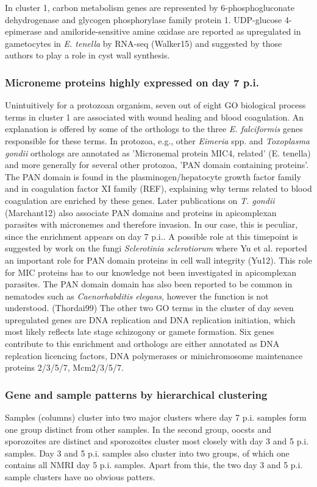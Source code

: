 \documentclass{bmcart}
\begin{document}
In cluster 1, carbon metabolism genes are represented by 6-phosphogluconate dehydrogenase 
and glycogen phosphorylase family protein 1. UDP-glucose 4-epimerase and amiloride-sensitive 
amine oxidase are reported as upregulated in gametocytes in \textit{E. tenella} by 
RNA-seq (Walker15) and suggested by those authors to play a role in cyst wall synthesis.

\subsubsection*{Microneme proteins highly expressed on day 7 p.i.}
Unintuitively for a protozoan organism, seven out of eight GO biological process terms
in cluster 1 are associated with wound healing and blood coagulation.
An explanation is offered by some of the orthologs to the three \textit{E. falciformis} genes
responsible for these terms. In protozoa, e.g., other \textit{Eimeria} spp. and 
\textit{Toxoplasma gondii} orthologs are annotated as 'Micronemal protein MIC4,
related' (E. tenella) and more generally for several other protozoa, 'PAN domain containing proteins'.
The PAN domain is found in the plasminogen/hepatocyte growth factor family and in coagulation 
factor XI family (REF), explaining why terms related to blood coagulation are enriched by these genes.
Later publications on \textit{T. gondii} (Marchant12) also associate PAN domains and proteins in 
apicomplexan parasites with micronemes and therefore invasion. In our case, this is peculiar, since 
the enrichment appears on day 7 p.i.. A possible role at this timepoint is suggested by work on 
the fungi \textit{Sclerotinia sclerotiorum} where Yu et al. reported an important role for PAN domain
proteins in cell wall integrity (Yu12). This role for MIC proteins has to our knowledge 
not been investigated in apicomplexan parasites. 
The PAN domain domain has also been reported to be common in nematodes such as 
\textit{Caenorhabditis elegans}, however the function is not understood. (Thordai99)
The other two GO terms in the cluster of day seven upregulated genes are DNA replication and DNA 
replication initiation, which most likely reflects late stage schizogony or gamete formation.
Six genes contribute to this enrichment and orthologs are either annotated as DNA replcation
licencing factors, DNA polymerases or minichromosome maintenance proteins 2/3/5/7, Mcm2/3/5/7.


\subsubsection*{Gene and sample patterns by hierarchical clustering}
Samples (columns) cluster into two major clusters where day 7 p.i. samples form one group distinct from
other samples. In the second group, oocsts and sporozoites are distinct and sporozoites cluster
most closely with day 3 and 5 p.i. samples. Day 3 and 5 p.i. samples also cluster into two groups,
of which one contains all NMRI day 5 p.i. samples. Apart from this, the two day 3 and 5 p.i. sample
clusters have no obvious patters. 
\end{document}
